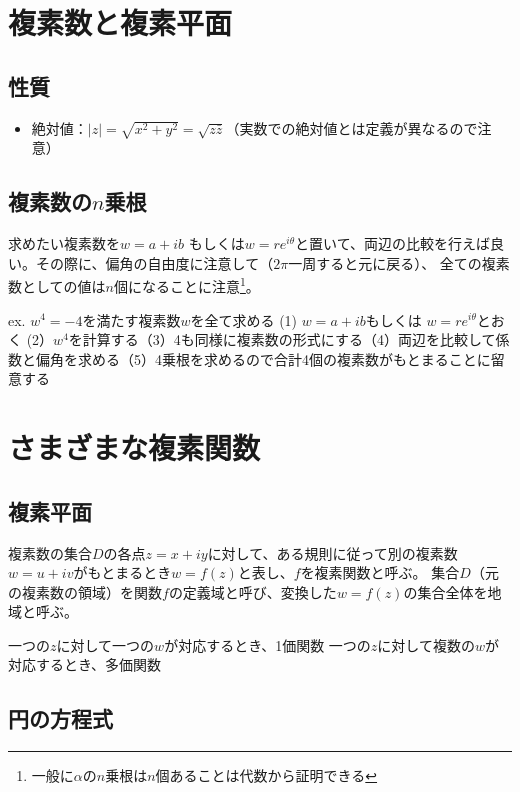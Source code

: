 \documentclass[a4j,10t]{jreport}
\begin{document}
\chapter{複素数と複素平面}

\section{性質}

\begin{itemize}
  \item 絶対値：$|z|=\sqrt{x^2+y^2}=\sqrt{z\bar{z}}$（実数での絶対値とは定義が異なるので注意）
\end{itemize}

\section{複素数の$n$乗根}
求めたい複素数を$w=a+ib$ もしくは$w=re^{i\theta}$と置いて、両辺の比較を行えば良い。その際に、偏角の自由度に注意して（$2\pi$一周すると元に戻る）、
全ての複素数としての値は$n$個になることに注意\footnote{一般に$\alpha$の$n$乗根は$n$個あることは代数から証明できる}。

ex.
$w^4=-4$を満たす複素数$w$を全て求める
(1) $w=a+ib$もしくは $w=re^{i\theta}$とおく
(2）$w^4$を計算する（3）4も同様に複素数の形式にする（4）両辺を比較して係数と偏角を求める（5）4乗根を求めるので合計4個の複素数がもとまることに留意する





\chapter{さまざまな複素関数}


\section{複素平面}

複素数の集合$D$の各点$z=x+iy$に対して、ある規則に従って別の複素数$w=u+iv$がもとまるとき$w=f(z)$と表し、$f$を複素関数と呼ぶ。
集合$D$（元の複素数の領域）を関数$f$の定義域と呼び、変換した$w=f(z)$の集合全体を地域と呼ぶ。

一つの$z$に対して一つの$w$が対応するとき、1価関数
一つの$z$に対して複数の$w$が対応するとき、多価関数


\section{円の方程式}
\end{document}

